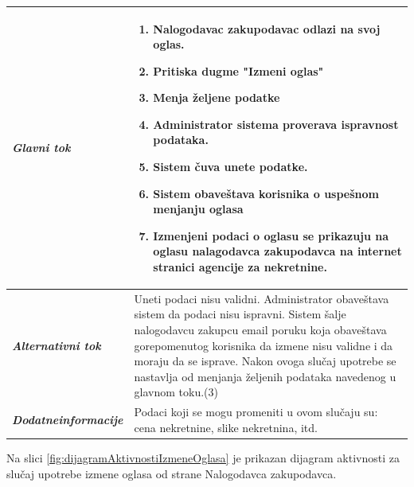 \documentclass[20pt]{article}
\begin{document}
\begin{center}
\begin{longtable}{p{0.23\linewidth} p{0.77\linewidth}}
     {\it \bfseries Glavni tok} &  
     \begin{enumerate}
         \item Nalogodavac zakupodavac odlazi na svoj oglas.
         \item Pritiska dugme "Izmeni oglas"
         \item Menja \v {z}eljene podatke
         \item Administrator sistema proverava ispravnost podataka.
         \item Sistem \v {c}uva unete podatke.
         \item Sistem obave\v {s}tava korisnika o uspe\v {s}nom menjanju oglasa
         \item Izmenjeni podaci o oglasu se prikazuju na oglasu nalagodavca zakupodavca na internet stranici agencije za nekretnine.
    \end{enumerate}\\
 \hline
 {\it \bfseries Alternativni tok} & Uneti podaci nisu validni. Administrator obave\v {s}tava sistem da podaci nisu ispravni. Sistem \v {s}alje nalogodavcu zakupcu email poruku koja obave\v {s}tava gorepomenutog korisnika da izmene nisu validne i da moraju da se isprave. Nakon ovoga slu\v {c}aj upotrebe se nastavlja od menjanja \v {z}eljenih podataka navedenog u glavnom toku.(3)\\
 \hline
 {\it \bfseries Dodatne\newline informacije} & Podaci koji se mogu promeniti u ovom slu\v {c}aju su: cena nekretnine, slike nekretnina, itd.\\
 \hline

\end{longtable}
\end{center}

Na slici \ref{fig:dijagramAktivnostiIzmeneOglasa} je prikazan dijagram aktivnosti za slu\v{c}aj upotrebe izmene oglasa od strane Nalogodavca zakupodavca.
\end{document}
